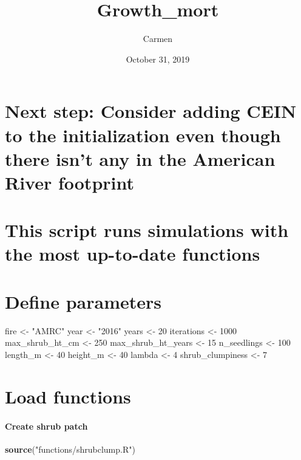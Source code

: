\documentclass[]{article}
\title{Growth\_mort}
\author{Carmen}
\date{October 31, 2019}
\newenvironment{Shaded}{\begin{snugshade}}{\end{snugshade}}
\newcommand{\KeywordTok}[1]{\textcolor[rgb]{0.13,0.29,0.53}{\textbf{#1}}}
\newcommand{\DecValTok}[1]{\textcolor[rgb]{0.00,0.00,0.81}{#1}}
\newcommand{\StringTok}[1]{\textcolor[rgb]{0.31,0.60,0.02}{#1}}
\newcommand{\NormalTok}[1]{#1}
\let\oldparagraph\paragraph
\renewcommand{\paragraph}[1]{\oldparagraph{#1}\mbox{}}
\begin{document}
\maketitle

\section{Next step: Consider adding CEIN to the initialization even
though there isn't any in the American River
footprint}\label{next-step-consider-adding-cein-to-the-initialization-even-though-there-isnt-any-in-the-american-river-footprint}

\section{This script runs simulations with the most up-to-date
functions}\label{this-script-runs-simulations-with-the-most-up-to-date-functions}

\section{Define parameters}\label{define-parameters}

\begin{Shaded}
\begin{Highlighting}[]
\NormalTok{fire <-}\StringTok{ "AMRC"}
\NormalTok{year <-}\StringTok{ "2016"}
\NormalTok{years <-}\StringTok{ }\DecValTok{20}
\NormalTok{iterations <-}\StringTok{ }\DecValTok{1000}
\NormalTok{max_shrub_ht_cm <-}\StringTok{ }\DecValTok{250}
\NormalTok{max_shrub_ht_years <-}\StringTok{ }\DecValTok{15}
\NormalTok{n_seedlings <-}\StringTok{ }\DecValTok{100}
\NormalTok{length_m <-}\StringTok{ }\DecValTok{40}
\NormalTok{height_m <-}\StringTok{ }\DecValTok{40}
\NormalTok{lambda <-}\StringTok{ }\DecValTok{4}
\NormalTok{shrub_clumpiness <-}\StringTok{ }\DecValTok{7}
\end{Highlighting}
\end{Shaded}

\section{Load functions}\label{load-functions}

\paragraph{Create shrub patch}\label{create-shrub-patch}

\begin{Shaded}
\begin{Highlighting}[]
\KeywordTok{source}\NormalTok{(}\StringTok{"functions/shrubclump.R"}\NormalTok{)}
\end{Highlighting}
\end{Shaded}
\end{document}
